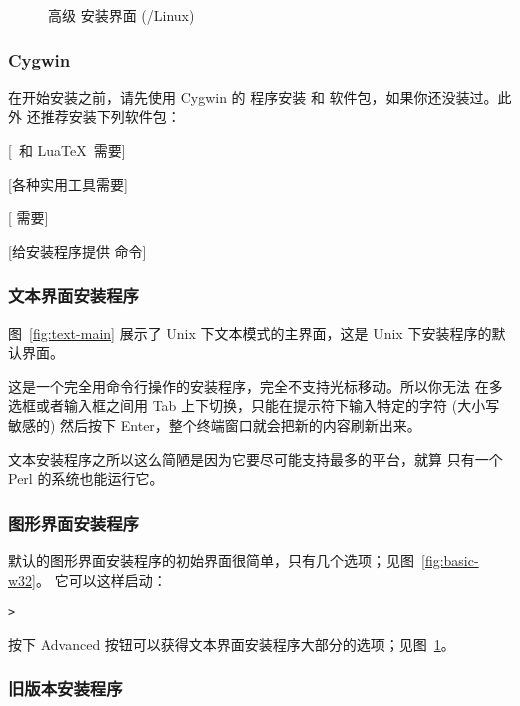 \documentclass{article}
\begin{document}
\begin{figure}[tb]
\caption{高级 \GUI{} 安装界面
  (\GNU/Linux)}\label{fig:advanced-lnx}
\end{figure}


\subsubsection{Cygwin}
\label{sec:cygwin}

在开始安装之前，请先使用 Cygwin 的  程序安装
 和  软件包，如果你还没装过。此外
还推荐安装下列软件包：
\begin{itemize*}
\item {} [\XeTeX\ 和 Lua\TeX\ 需要]
\item {} [各种实用工具需要]
\item {} [ 需要]
\item {} [给安装程序提供  命令]
\end{itemize*}

\subsubsection{文本界面安装程序}

图~\ref{fig:text-main} 展示了 Unix 下文本模式的主界面，这是 Unix
下安装程序的默认界面。

这是一个完全用命令行操作的安装程序，完全不支持光标移动。所以你无法
在多选框或者输入框之间用 Tab 上下切换，只能在提示符下输入特定的字符
(大小写敏感的) 然后按下 Enter，整个终端窗口就会把新的内容刷新出来。

文本安装程序之所以这么简陋是因为它要尽可能支持最多的平台，就算
只有一个 Perl 的系统也能运行它。

\subsubsection{图形界面安装程序}
\label{sec:graphical-inst}

默认的图形界面安装程序的初始界面很简单，只有几个选项；见图~\ref{fig:basic-w32}。
它可以这样启动：
\begin{alltt}
> 
\end{alltt}
按下 Advanced 按钮可以获得文本界面安装程序大部分的选项；见图~\ref{fig:advanced-lnx}。

\subsubsection{旧版本安装程序}
\end{document}
